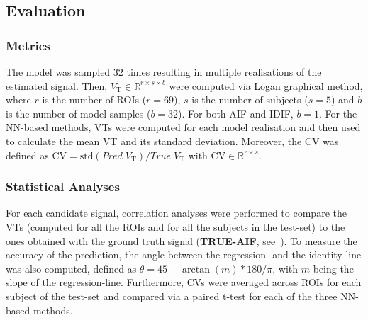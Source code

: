 
    \vspace{-0.44cm}
    
    \subsection{Evaluation}\label{sec:evaluation}
    \vspace{-0.1cm}

        \subsubsection{Metrics} \label{sec:metrics}
         The model was sampled $32$ times resulting in multiple realisations of the estimated signal. Then, $V_{\mathrm{T}} \in \mathbb{R}^{r \times s \times b}$ were computed via Logan graphical method, where $r$ is the number of \glspl{ROI} ($r = 69$), $s$ is the number of subjects ($s = 5$) and $b$ is the number of model samples ($b = 32$). For both AIF and IDIF, $b=1$. For the \gls{NN}-based methods, \glspl{VT} were computed for each model realisation and then used to calculate the mean \gls{VT} and its standard deviation.
        Moreover, the \gls{CV} was defined as $\mathrm{CV} = \mathrm{std} ( Pred \; V_{\mathrm{T}} ) / True \; V_{\mathrm{T}}$ with $\mathrm{CV} \in \mathbb{R}^{r \times s }$.

        \subsubsection{Statistical Analyses} \label{sec:stats}
        For each candidate signal, correlation analyses were performed to compare the \glspl{VT} (computed for all the \glspl{ROI} and for all the subjects in the test-set) to the ones obtained with the ground truth signal (\textbf{TRUE-AIF}, see~). To measure the accuracy of the prediction, the angle between the regression- and the identity-line was also computed, defined as $\theta = 45 - \arctan(m)*180/\pi$, with $m$ being the slope of the regression-line.
        Furthermore, \glspl{CV} were averaged across \glspl{ROI} for each subject of the test-set and compared via a paired t-test for each of the three \gls{NN}-based methods.
       
